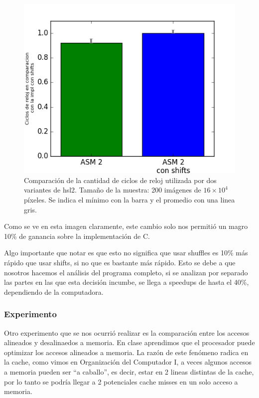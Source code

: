 \begin{figure}[!hbt] 
	\centering
  \includegraphics[scale=0.7]{images/hsl-shsh.png}
  \caption{Comparación de la cantidad de ciclos de reloj utilizada por dos variantes de hsl2. Tamaño de la muestra: 200 imágenes de $16 \times 10^4$ píxeles. Se indica el mínimo con la barra y el promedio con una linea gris.}
\end{figure}

Como se ve en esta imagen claramente, este cambio solo nos permitió un magro 10\% de ganancia sobre la implementación de C.

Algo importante que notar es que esto no significa que usar shuffles es 10\% más rápido que usar shifts, si no que es bastante más rápido. Esto se debe a que nosotros hacemos el análisis del programa completo, si se analizan por separado las partes en las que esta decisión incumbe, se llega a speedups de hasta el 40\%, dependiendo de la computadora.
\\

\subsubsection*{Experimento}
Otro experimento que se nos ocurrió realizar es la comparación entre los accesos alineados y desalinaedos a memoria. En clase aprendimos que el procesador puede optimizar los accesos alineados a memoria.
La razón de este fenómeno radica en la cache, como vimos en Organización del Computador I, a veces algunos accesos a memoria pueden ser ``a caballo'', es decir, estar en 2 lineas distintas de la cache, por lo tanto se podría llegar a 2 potenciales cache misses en un solo acceso a memoria.


